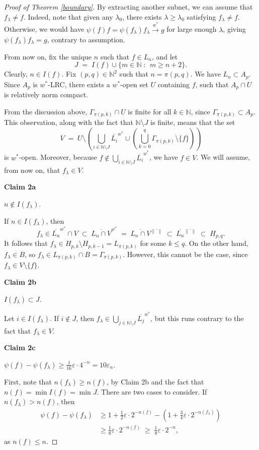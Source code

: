 \documentclass[12pt,a4paper]{amsart}
\theoremstyle{definition}
\theoremstyle{remark}
\newcommand{\cl}[1]{\ensuremath{\overline{{#1}}}}
\newcommand{\eps}{\ensuremath{\varepsilon}}
\newcommand{\N}{\mathbb{N}}
\newcommand{\ndot}{\ensuremath{\left\|\cdot\right\|}}
\newcommand{\set}[2]{\{{#1} \;:\;\, {#2}\}}
\begin{document}
\begin{proof}[Proof of Theorem \ref{boundary}]
By extracting another subnet, we can assume that $f_\lambda \neq f$.
Indeed, note that given any $\lambda_0$, there exists $\lambda \geq
\lambda_0$ satisfying $f_\lambda \neq f$. Otherwise, we would have
$\psi(f)f =  \psi(f_\lambda)f_\lambda \stackrel{w^*}{\to} g$ for
large enough $\lambda$, giving $\psi(f_\lambda)f_\lambda = g$,
contrary to assumption.

From now on, fix the unique $n$ such that $f \in L_n$, and let
\[
J \;=\; I(f) \cup \set{m \in \N}{m \geq n+2}.
\]
Clearly, $n \in I(f)$. Fix $(p,q) \in \N^2$ such that $n=\pi(p,q)$.
We have $L_n \subset A_p$. Since $A_p$ is $w^*$-LRC, there exists a
$w^*$-open set $U$ containing $f$, such that $A_p \cap U$ is
relatively norm compact.

From the discussion above, $\Gamma_{\pi(p,k)} \cap U$ is finite for
all $k \in \N$, since $\Gamma_{\pi(p,k)} \subset A_p$. This
observation, along with the fact that $\N\setminus J$ is finite,
means that the set
\[
V \;=\; U\setminus\left(\bigcup_{i \in \N\setminus J} \cl{L_i}^{w^*}
\cup \left(\bigcup_{k=0}^q \Gamma_{\pi(p,k)}\setminus\{f\}
\right)\right)
\]
is $w^*$-open. Moreover, because $f \notin \bigcup_{i \in
\N\setminus J} \cl{L_i}^{w^*}$, we have $f \in V$. We
will assume, from now on, that $f_\lambda \in V$.

\textbf{Claim 2a}

$n \notin I(f_\lambda)$.

If $n \in I(f_\lambda)$, then
\[
f_\lambda \in \cl{L_n}^{w^*} \cap V
\;\subset\; \cl{L_n \cap V}^{w^*} \;=\;
\cl{L_n \cap V}^{\ndot} \;\subset\; \cl{L_n}^{\ndot} \;\subset\; H_{p,q}.
\]
It follows that $f_\lambda \in H_{p,k}\setminus H_{p,k-1} =
L_{\pi(p,k)}$ for some $k \leq q$. On the other hand, $f_\lambda \in
B$, so $f_\lambda \in L_{\pi(p,k)} \cap B = \Gamma_{\pi(p,k)}$.
However, this cannot be the case, since $f_\lambda \in
V\setminus\{f\}$.

\textbf{Claim 2b}

$I(f_\lambda) \subset J$.

Let $i \in I(f_\lambda)$. If $i \notin J$, then $f_\lambda \in
\bigcup_{j \in \N\setminus J} \cl{L_j}^{w^*}$, but this runs
contrary to the fact that $f_\lambda \in V$.

\textbf{Claim 2c}

$\psi(f) - \psi(f_\lambda) \geq {\textstyle \frac{1}{16}}\eps\cdot
4^{-n} = 10\eps_n$.

First, note that $n(f_\lambda) \geq n(f)$, by Claim 2b and the fact
that $n(f) = \min I(f) = \min J$. There are two cases to consider.
If $n(f_\lambda) > n(f)$, then
\begin{align*}
\psi(f) - \psi(f_\lambda) &\geq 1 + {\textstyle
\frac{1}{2}}\eps\cdot 2^{-n(f)} - (1 + {\textstyle
\frac{3}{4}}\eps\cdot 2^{-n(f_\lambda)}) \\
&\geq {\textstyle \frac{1}{8}}\eps\cdot 2^{-n(f)} \;\geq\;
{\textstyle \frac{1}{8}}\eps\cdot 2^{-n},
\end{align*}
as $n(f)\leq n$.


\end{proof}
\end{document}
